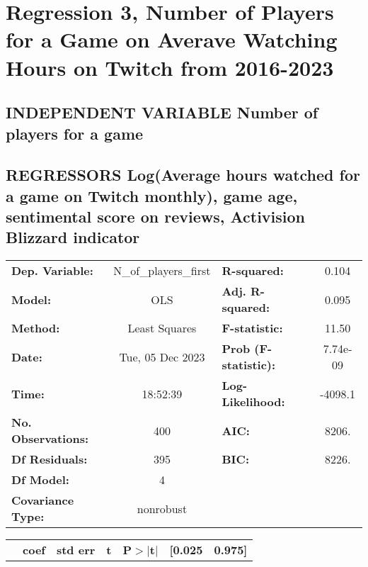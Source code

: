 \documentclass{report}
\begin{document}
\section*{Regression 3, Number of Players for a Game on Averave Watching Hours on Twitch from 2016-2023}\bigskip
\subsection*{INDEPENDENT VARIABLE Number of players for a game}\bigskip
\subsection*{REGRESSORS Log(Average hours watched for a game on Twitch monthly), game age, sentimental score on reviews, Activision Blizzard indicator}\bigskip
\begin{center}
\begin{tabular}{lclc}
\toprule
\textbf{Dep. Variable:}            & N\_of\_players\_first & \textbf{  R-squared:         } &     0.104   \\
\textbf{Model:}                    &          OLS          & \textbf{  Adj. R-squared:    } &     0.095   \\
\textbf{Method:}                   &     Least Squares     & \textbf{  F-statistic:       } &     11.50   \\
\textbf{Date:}                     &    Tue, 05 Dec 2023   & \textbf{  Prob (F-statistic):} &  7.74e-09   \\
\textbf{Time:}                     &        18:52:39       & \textbf{  Log-Likelihood:    } &   -4098.1   \\
\textbf{No. Observations:}         &            400        & \textbf{  AIC:               } &     8206.   \\
\textbf{Df Residuals:}             &            395        & \textbf{  BIC:               } &     8226.   \\
\textbf{Df Model:}                 &              4        & \textbf{                     } &             \\
\textbf{Covariance Type:}          &       nonrobust       & \textbf{                     } &             \\
\bottomrule
\end{tabular}
\begin{tabular}{lcccccc}
                                   & \textbf{coef} & \textbf{std err} & \textbf{t} & \textbf{P$> |$t$|$} & \textbf{[0.025} & \textbf{0.975]}  \\

\end{tabular}
\end{center}
\end{document}
